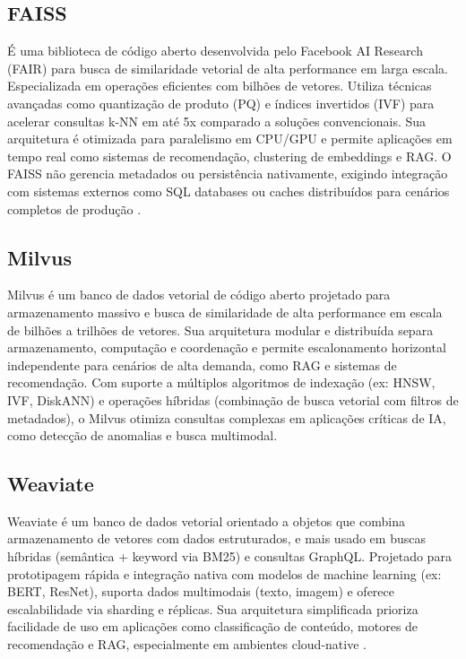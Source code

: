\subsection{FAISS}
É uma biblioteca de código aberto desenvolvida pelo Facebook AI Research (FAIR) para busca de similaridade vetorial de alta performance em larga escala. Especializada em operações eficientes com bilhões de vetores. Utiliza técnicas avançadas como quantização de produto (PQ) e índices invertidos (IVF) para acelerar consultas k-NN em até 5x comparado a soluções convencionais. Sua arquitetura é otimizada para paralelismo em CPU/GPU e permite aplicações em tempo real como sistemas de recomendação, clustering de embeddings e RAG. O FAISS não gerencia metadados ou persistência nativamente, exigindo integração com sistemas externos como SQL databases ou caches distribuídos para cenários completos de produção \cite{facebook2024faiss}.

\subsection{Milvus}
Milvus é um banco de dados vetorial de código aberto projetado para armazenamento massivo e busca de similaridade de alta performance em escala de bilhões a trilhões de vetores. Sua arquitetura modular e distribuída separa armazenamento, computação e coordenação e permite escalonamento horizontal independente para cenários de alta demanda, como RAG e sistemas de recomendação. Com suporte a múltiplos algoritmos de indexação (ex: HNSW, IVF, DiskANN) e operações híbridas (combinação de busca vetorial com filtros de metadados), o Milvus otimiza consultas complexas em aplicações críticas de IA, como detecção de anomalias e busca multimodal\cite{milvus2025}.

\subsection{Weaviate}
Weaviate é um banco de dados vetorial orientado a objetos que combina armazenamento de vetores com dados estruturados, e mais usado em buscas híbridas (semântica + keyword via BM25) e consultas GraphQL. Projetado para prototipagem rápida e integração nativa com modelos de machine learning (ex: BERT, ResNet), suporta dados multimodais (texto, imagem) e oferece escalabilidade via sharding e réplicas. Sua arquitetura simplificada prioriza facilidade de uso em aplicações como classificação de conteúdo, motores de recomendação e RAG, especialmente em ambientes cloud-native \cite{weaviate2025}.


